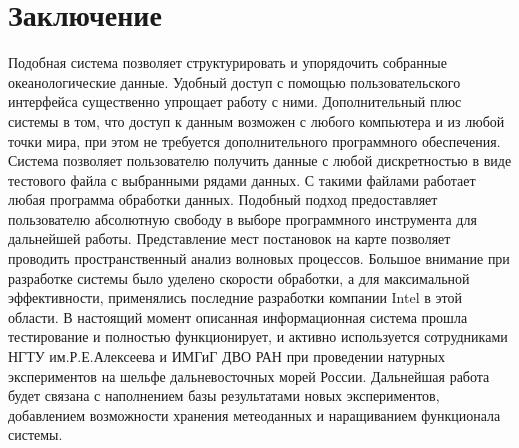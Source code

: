 \section{Заключение}

Подобная система позволяет структурировать и упорядочить собранные океанологические данные. Удобный доступ с помощью пользовательского интерфейса существенно упрощает работу с ними. Дополнительный плюс системы в том, что доступ к данным возможен с любого компьютера и из любой точки мира, при этом не требуется дополнительного программного обеспечения. Система позволяет пользователю получить данные с любой дискретностью в виде тестового файла с выбранными рядами данных. С такими файлами работает любая программа обработки данных. Подобный подход предоставляет пользователю абсолютную свободу в выборе программного инструмента для дальнейшей работы. Представление мест постановок на карте позволяет проводить пространственный анализ волновых процессов. Большое внимание при разработке системы было уделено скорости обработки, а для максимальной эффективности, применялись последние разработки компании Intel в этой области.
В настоящий момент описанная информационная система прошла тестирование и полностью функционирует, и активно используется сотрудниками НГТУ им.Р.Е.Алексеева и ИМГиГ ДВО РАН при проведении натурных экспериментов на шельфе дальневосточных морей России. Дальнейшая работа будет связана с наполнением базы результатами новых экспериментов, добавлением возможности хранения метеоданных и наращиванием функционала системы.

\clearpage
